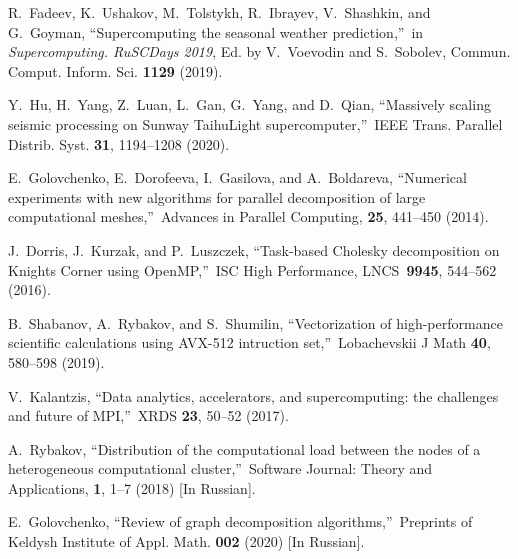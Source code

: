 \documentclass[
11pt,%
tightenlines,%
twoside,%
onecolumn,%
nofloats,%
nobibnotes,%
nofootinbib,%
superscriptaddress,%
noshowpacs,%
centertags]%
{revtex4}
\begin{document}
\begin{thebibliography}{99}


R.~Fadeev, K.~Ushakov, M.~Tolstykh, R.~Ibrayev, V.~Shashkin, and G.~Goyman, \textquotedblleft Supercomputing the seasonal weather prediction,\textquotedblright \ in \textit{Supercomputing. RuSCDays 2019}, Ed. by V.~Voevodin and S.~Sobolev, Commun. Comput. Inform. Sci. \textbf{1129} (2019).

Y.~Hu, H.~Yang, Z.~Luan, L.~Gan, G.~Yang, and D.~Qian, \textquotedblleft Massively scaling seismic processing on Sunway TaihuLight supercomputer,\textquotedblright \ IEEE Trans. Parallel Distrib. Syst. \textbf{31}, 1194--1208 (2020).

E.~Golovchenko, E.~Dorofeeva, I.~Gasilova, and A.~Boldareva, \textquotedblleft Numerical experiments with new algorithms for parallel decomposition of large computational meshes,\textquotedblright \ Advances in Parallel Computing, \textbf{25}, 441--450 (2014).

J.~Dorris, J.~Kurzak, and P.~Luszczek, \textquotedblleft Task-based Cholesky decomposition on Knights Corner using OpenMP,\textquotedblright \ ISC High Performance, LNCS~\textbf{9945}, 544--562 (2016).

B.~Shabanov, A.~Rybakov, and S.~Shumilin, \textquotedblleft Vectorization of high-performance scientific calculations using AVX-512 intruction set,\textquotedblright \ Lobachevskii J Math {\bf 40}, 580--598 (2019).

V.~Kalantzis, \textquotedblleft Data analytics, accelerators, and supercomputing: the challenges and future of MPI,\textquotedblright \ XRDS {\bf 23}, 50--52 (2017).

A.~Rybakov, \textquotedblleft Distribution of the computational load between the nodes of a heterogeneous computational cluster,\textquotedblright \ Software Journal:
Theory and Applications, \textbf{1}, 1--7 (2018) [In Russian].


E.~Golovchenko, \textquotedblleft Review of graph decomposition algorithms,\textquotedblright \ Preprints of Keldysh Institute of Appl. Math. \textbf{002} (2020) [In Russian].


\end{thebibliography}
\end{document}
